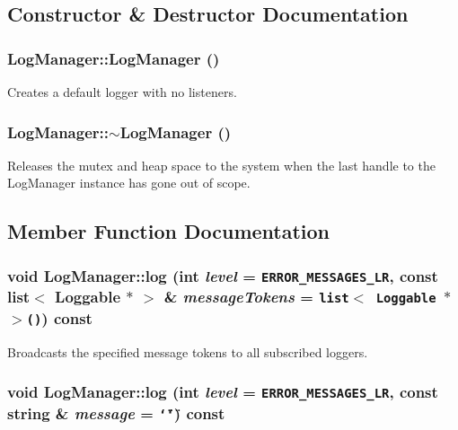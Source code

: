 \subsection{Constructor \& Destructor Documentation}
\subsubsection{\setlength{\rightskip}{0pt plus 5cm}Log\-Manager::Log\-Manager ()\hspace{0.3cm}{\tt  [protected]}}\label{classLogManager_b0}


Creates a default logger with no listeners.
\subsubsection{\setlength{\rightskip}{0pt plus 5cm}Log\-Manager::$\sim$Log\-Manager ()\hspace{0.3cm}{\tt  [inline]}}\label{classLogManager_a0}


Releases the mutex and heap space to the system when the last handle to the Log\-Manager instance has gone out of scope.

\subsection{Member Function Documentation}
\subsubsection{\setlength{\rightskip}{0pt plus 5cm}void Log\-Manager::log (int {\em level} = {\tt ERROR\_\-MESSAGES\_\-LR}, const list$<$ {\bf Loggable} $\ast$ $>$ \& {\em message\-Tokens} = {\tt list$<$~{\bf Loggable}~$\ast$~$>$()}) const}\label{classLogManager_a3}


Broadcasts the specified message tokens to all subscribed loggers.
\subsubsection{\setlength{\rightskip}{0pt plus 5cm}void Log\-Manager::log (int {\em level} = {\tt ERROR\_\-MESSAGES\_\-LR}, const string \& {\em message} = {\tt \char`\"{}\char`\"{}}) const}\label{classLogManager_a2}


